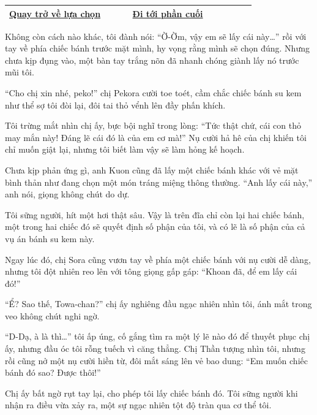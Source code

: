 \documentclass[../main.tex]{subfiles}
\begin{document}
\begin{table}[H]
  \centering
  \setlength{\arrayrulewidth}{1pt}
  \begin{tabular}{|>{\centering\arraybackslash}p{0.4\linewidth}|>{\centering\arraybackslash}p{0.4\linewidth}|}
    \hline
    \hyperref[choice]{Quay trở về lựa chọn} & \hyperref[ending]{Đi tới phần cuối} \\ \hline
  \end{tabular}
\end{table}

\newpage
\label{cakeD}

Không còn cách nào khác, tôi đành nói: ``Ờ-Ờm, vậy em sẽ lấy cái này\dots'' rồi với tay về phía chiếc bánh trước mặt mình, hy vọng rằng mình sẽ chọn đúng. Nhưng chưa kịp đụng vào, một bàn tay trắng nõn đã nhanh chóng giành lấy nó trước mũi tôi.

``Cho chị xin nhé, peko!'' chị Pekora cười toe toét, cầm chắc chiếc bánh su kem như thể sợ tôi đòi lại, đôi tai thỏ vểnh lên đầy phấn khích.

Tôi trừng mắt nhìn chị ấy, bực bội nghĩ trong lòng: ``Tức thật chứ, cái con thỏ may mắn này! Đáng lẽ cái đó là của em cơ mà!'' Nụ cười hả hê của chị khiến tôi chỉ muốn giật lại, nhưng tôi biết làm vậy sẽ làm hỏng kế hoạch.

Chưa kịp phản ứng gì, anh Kuon cũng đã lấy một chiếc bánh khác với vẻ mặt bình thản như đang chọn một món tráng miệng thông thường. ``Anh lấy cái này,'' anh nói, giọng không chút do dự.

Tôi sững người, hít một hơi thật sâu. Vậy là trên đĩa chỉ còn lại hai chiếc bánh, một trong hai chiếc đó sẽ quyết định số phận của tôi, và có lẽ là số phận của cả vụ án bánh su kem này.

Ngay lúc đó, chị Sora cũng vươn tay về phía một chiếc bánh với nụ cười dễ dàng, nhưng tôi đột nhiên reo lên với tông giọng gấp gáp: ``Khoan đã, để em lấy cái đó!''

``Ể? Sao thế, Towa-chan?'' chị ấy nghiêng đầu ngạc nhiên nhìn tôi, ánh mắt trong veo không chút nghi ngờ.

``D-Dạ, à là thì\dots'' tôi ấp úng, cố gắng tìm ra một lý lẽ nào đó để thuyết phục chị ấy, nhưng đầu óc tôi rỗng tuếch vì căng thẳng. Chị Thần tượng nhìn tôi, nhưng rồi cũng nở một nụ cười hiền từ, đôi mắt sáng lên vẻ bao dung: ``Em muốn chiếc bánh đó sao? Được thôi!''

Chị ấy bất ngờ rụt tay lại, cho phép tôi lấy chiếc bánh đó. Tôi sững người khi nhận ra điều vừa xảy ra, một sự ngạc nhiên tột độ tràn qua cơ thể tôi.
\end{document}

